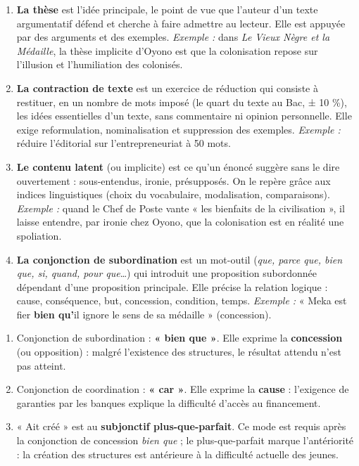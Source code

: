 \documentclass[11pt]{article}
\begin{document}
\begin{corrige}
\begin{enumerate}
\item \textbf{La thèse} est l'idée principale, le point de vue que l'auteur d'un texte argumentatif défend et cherche à faire admettre au lecteur. Elle est appuyée par des arguments et des exemples. \emph{Exemple :} dans \emph{Le Vieux Nègre et la Médaille}, la thèse implicite d'Oyono est que la colonisation repose sur l'illusion et l'humiliation des colonisés.
\item \textbf{La contraction de texte} est un exercice de réduction qui consiste à restituer, en un nombre de mots imposé (le quart du texte au Bac, ± 10 \%), les idées essentielles d'un texte, sans commentaire ni opinion personnelle. Elle exige reformulation, nominalisation et suppression des exemples. \emph{Exemple :} réduire l'éditorial sur l'entrepreneuriat à 50 mots.
\item \textbf{Le contenu latent} (ou implicite) est ce qu'un énoncé suggère sans le dire ouvertement : sous-entendus, ironie, présupposés. On le repère grâce aux indices linguistiques (choix du vocabulaire, modalisation, comparaisons). \emph{Exemple :} quand le Chef de Poste vante « les bienfaits de la civilisation », il laisse entendre, par ironie chez Oyono, que la colonisation est en réalité une spoliation.
\item \textbf{La conjonction de subordination} est un mot-outil (\emph{que, parce que, bien que, si, quand, pour que}\ldots) qui introduit une proposition subordonnée dépendant d'une proposition principale. Elle précise la relation logique : cause, conséquence, but, concession, condition, temps. \emph{Exemple :} « Meka est fier \textbf{bien qu'}il ignore le sens de sa médaille » (concession).
\end{enumerate}
\end{corrige}

\begin{corrige}
\begin{enumerate}
\item Conjonction de subordination : \textbf{« bien que »}. Elle exprime la \textbf{concession} (ou opposition) : malgré l'existence des structures, le résultat attendu n'est pas atteint.
\item Conjonction de coordination : \textbf{« car »}. Elle exprime la \textbf{cause} : l'exigence de garanties par les banques explique la difficulté d'accès au financement.
\item « Ait créé » est au \textbf{subjonctif plus-que-parfait}. Ce mode est requis après la conjonction de concession \emph{bien que} ; le plus-que-parfait marque l'antériorité : la création des structures est antérieure à la difficulté actuelle des jeunes.
\end{enumerate}
\end{corrige}
\end{document}
